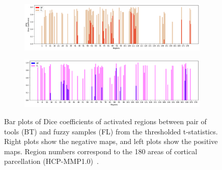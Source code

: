 \documentclass[runningheads]{llncs}
\begin{document}
\begin{figure}[b]
{\begin{minipage}{\dimexpr \textwidth-2\fboxsep-2\fboxrule}
\begin{subfigure}[t]{0.5\linewidth}
      \label{fig:spm-dices}
    \end{subfigure}  
  \hfill
    \begin{subfigure}[t]{0.5\linewidth}
      \centering
      \includegraphics[width=\linewidth]{figures/afni-exc_set_file.png}
      \label{fig:fsl-dices}
    \end{subfigure}
    \hfill
    \begin{subfigure}[t]{0.5\linewidth}
      \centering
      \includegraphics[width=\linewidth]{figures/afni-exc_set_file_neg.png}
      \label{fig:spm-dices}
    \end{subfigure}
  
  \caption{Bar plots of Dice coefficients of activated regions between pair of tools (BT) and fuzzy samples (FL) from the thresholded t-statistics.
  Right plots show the negative maps, and left plots show the positive maps. 
  Region numbers correspond to the 180 areas of cortical parcellation (HCP-MMP1.0)~\cite{Glasser-nature}.}
  \label{fig:unthresh-dices}
  \end{minipage}}
\end{figure}
\end{document}
